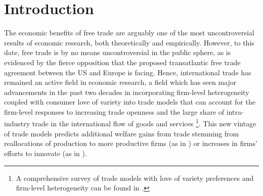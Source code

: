 \documentclass[a4paper,12pt]{article}
\begin{document}
\section{Introduction}
The economic benefits of free trade are arguably one of the most uncontroversial results of economic research, both theoretically and empirically. However, to this date, free trade is by no means uncontroversial in the public sphere, as is evidenced by the fierce opposition that the proposed transatlantic free trade agreement between the US and Europe is facing. Hence, international trade has remained an active field in economic research, a field which has seen major advancements in the past two decades in incorporating firm-level heterogeneity coupled with consumer love of variety into trade models that can account for the firm-level responses to increasing trade openness and the large share of intra-industry trade in the international flow of goods and services \footnote{A comprehensive survey of trade models with love of variety preferences and firm-level heterogeneity can be found in \citet*{MelitzTrefler2012}.}. This new vintage of trade models predicts additional welfare gains from trade stemming from reallocations of production to more productive firms (as in \citealp{Melitz2003}) or increases in firms' efforts to innovate (as in \citealp{GrossmanHelpman1990}). \\
\end{document}
